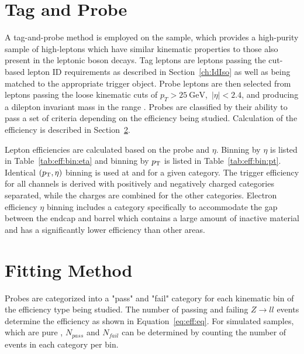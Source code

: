 % 
% 


\section{Tag and Probe}\label{ch:eff:tagandprobe}
A tag-and-probe method is employed on the \zll sample, which provides a high-purity sample of high-\pt leptons which have similar kinematic properties to those also present in the leptonic \W boson decays\cite{Khachatryan:2010xn}. Tag leptons are leptons passing the cut-based lepton ID requirements as described in Section~\ref{ch:IdIso} as well as being matched to the appropriate trigger object. Probe leptons are then selected from leptons passing the loose kinematic cuts of $p_T > 25 \mathrm{~GeV}$,~$|\eta|<2.4$, and producing a dilepton invariant mass in the range \masswindow. Probes are classified by their ability to pass a set of criteria depending on the efficiency being studied. Calculation of the efficiency is described in Section~\ref{ch:eff:fitting}.

Lepton efficiencies are calculated based on the probe \pt and $\eta$. Binning by $\eta$ is listed in Table~\ref{tab:eff:bin:eta} and binning by $p_{\mathrm{T}}$ is listed in Table~\ref{tab:eff:bin:pt}. Identical $(p_{\mathrm{T}},\eta)$ binning is used at \serag and \serah for a given category. The trigger efficiency for all channels is derived with positively and negatively charged categories separated, while the charges are combined for the other categories. Electron efficiency $\eta$ binning includes a category specifically to accommodate the gap between the endcap and barrel which contains a large amount of inactive material and has a significantly lower efficiency than other areas.






\section{Fitting Method}\label{ch:eff:fitting}
Probes are categorized into a "pass" and "fail" category for each kinematic bin of the efficiency type being studied. The number of passing and failing $Z\rightarrow ll$ events determine the efficiency as shown in Equation~\ref{eq:eff:eq}. For simulated samples, which are pure \zll, $N_{pass}$ and $N_{fail}$ can be determined by counting the number of events in each category per bin. 

